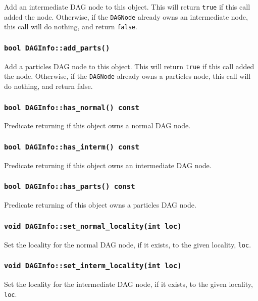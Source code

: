 Add an intermediate DAG node to this object. This will return \texttt{true} if
this call added the node. Otherwise, if the \texttt{DAGNode} already owns an
intermediate node, this call will do nothing, and return \texttt{false}.

\subsubsection{\texttt{bool DAGInfo::add\_parts()}}

Add a particles DAG node to this object. This will return \texttt{true} if this
call added the node. Otherwise, if the \texttt{DAGNode} already owns a particles
node, this call will do nothing, and return false.

\subsubsection{\texttt{bool DAGInfo::has\_normal() const}}

Predicate returning if this object owns a normal DAG node.

\subsubsection{\texttt{bool DAGInfo::has\_interm() const}}

Predicate returning if this object owns an intermediate DAG node.

\subsubsection{\texttt{bool DAGInfo::has\_parts() const}}

Predicate returning of this object owns a particles DAG node.

\subsubsection{\texttt{void DAGInfo::set\_normal\_locality(int loc)}}

Set the locality for the normal DAG node, if it exists, to the given
locality, \texttt{loc}.

\subsubsection{\texttt{void DAGInfo::set\_interm\_locality(int loc)}}

Set the locality for the intermediate DAG node, if it exists, to the given
locality, \texttt{loc}.

